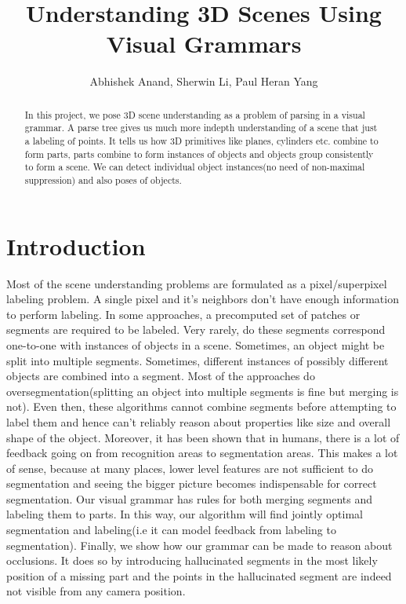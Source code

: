 \documentclass[11pt]{article} %
\title{Understanding 3D Scenes Using Visual Grammars}
\author{Abhishek Anand, Sherwin Li, Paul Heran Yang }
\begin{document}
\maketitle

\begin{abstract}
In this project, we pose 3D scene understanding as a problem of parsing in a visual grammar. A parse tree gives us much more indepth understanding of a scene that just a labeling of points. It tells us how 3D primitives like planes, cylinders etc. combine to form parts, parts combine to form instances of objects and objects group consistently to form a scene. We can detect individual object instances(no need of non-maximal suppression) and also poses of objects.
\end{abstract}

\section{Introduction}
Most of the scene understanding problems are formulated as a pixel/superpixel labeling problem. A single pixel and it's neighbors don't have enough information to perform labeling. In some approaches, a precomputed set of patches or segments are required to be labeled. Very rarely, do these segments correspond one-to-one with instances of objects in a scene. Sometimes, an object might be split into multiple segments. Sometimes, different instances of possibly different objects are combined into a segment. Most of the approaches do oversegmentation(splitting an object into multiple segments is fine but merging is not). Even then, these algorithms cannot combine segments before attempting to label them and hence can't reliably reason about properties like size and overall shape of the object. 
Moreover, it has been shown that in humans, there is a lot of feedback going on from recognition areas to segmentation areas. This makes a lot of sense, because at many places, lower level features are not sufficient to do segmentation and seeing the bigger picture becomes indispensable for correct segmentation. Our visual grammar has rules for both merging segments and labeling them to parts. In this way, our algorithm will find jointly optimal segmentation and labeling(i.e it can model feedback from labeling to segmentation).
Finally, we show how our grammar can be made to reason about occlusions. It does so by introducing hallucinated segments in the most likely position of a missing part and the points in the hallucinated segment are indeed not visible from any camera position.
\end{document}
